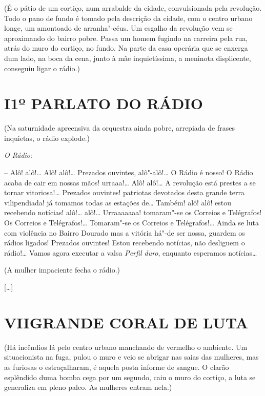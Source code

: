 {\hfill\parbox{150pt}{
(É o pátio de um cortiço, num arrabalde da cidade, convulsionada pela
revolução. Todo o pano de fundo é tomado pela descrição da cidade, com o
centro urbano longe, um amontoado de arranha"-céus. Um esgalho da
revolução vem se aproximando do bairro pobre. Passa um homem fugindo na
carreira pela rua, atrás do muro do cortiço, no fundo. Na parte da casa
operária que se enxerga dum lado, na boca da cena, junto à mãe
inquietíssima, a meninota displicente, conseguiu ligar o rádio.)
}

\section*{I\break 1º PARLATO DO RÁDIO}\medskip

\hfill\parbox{150pt}{
(Na saturnidade apreensiva da orquestra ainda pobre, arrepiada de frases
inquietas, o rádio explode.)
}

\emph{O Rádio}:

-- Alô! alô!\ldots{} Alô! alô!\ldots{} Prezados ouvintes, alô"-alô!\ldots{} O
Rádio é nosso! O Rádio acaba de cair em nossas mãos! urraaa!\ldots{} Alô!
alô!\ldots{} A revolução está prestes a se tornar vitoriosa!\ldots{} Prezados
ouvintes! patriotas devotados desta grande terra vilipendiada! já
tomamos todas as estações de\ldots{} Também! alô! alô! estou recebendo
notícias! alô!\ldots{} alô!\ldots{} Urraaaaaaa! tomaram"-se os Correios e
Telégrafos! Os Correios e Telégrafos!\ldots{} Tomaram"-se os Correios e
Telégrafos!\ldots{} Ainda se luta com violência no Bairro Dourado mas a
vitória há"-de ser nossa, guardem os rádios ligados! Prezados ouvintes!
Estou recebendo notícias, não desliguem o rádio!\ldots{} Vamos agora executar
a valsa \emph{Perfil duro}, enquanto esperamos notícias\ldots{}

\hfill{}(A mulher impaciente fecha o rádio.)

{[}\ldots{}{]}

\pagebreak
\section*{VII\break GRANDE CORAL DE LUTA}\medskip

\hfill\parbox{150pt}{
(Há incêndios lá pelo centro urbano manchando de vermelho o ambiente. Um
situacionista na fuga, pulou o muro e veio se abrigar nas saias das
mulheres, mas as furiosas o estraçalharam, é aquela posta informe de
sangue. O clarão esplêndido duma bomba cega por um segundo, caiu o muro
do cortiço, a luta se generaliza em pleno palco. As mulheres entram
nela.)
}

}
